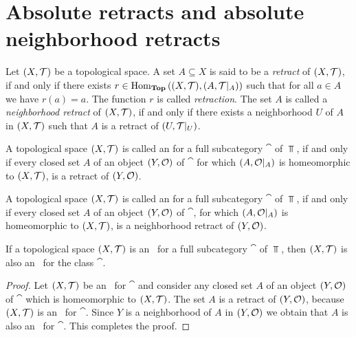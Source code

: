 \chapter{Absolute retracts and absolute neighborhood retracts}

\begin{definition}
	Let $\tspace$ be a topological space. A set $A \subseteq X$ is said to be a \textit{retract} of $\tspace$, if and only if there exists $r \in \Hom_\Top\pbraces{\tspace, \reltspace}$ such that for all $a \in A$ we have $r(a) = a$. The function $r$ is called \textit{retraction}. The set $A$ is called a \textit{neighborhood retract} of $\tspace$, if and only if there exists a neighborhood $U$ of $A$ in $\tspace$ such that $A$ is a retract of $\reltspace[U][T]$. 
\end{definition}

\begin{definition}
	A topological space $\tspace$ is called an \textit{\ar} for a full subcategory $\cat$ of $\Top$, if and only if every closed set $A$ of an object $\tspace[Y][O]$ of $\cat$ for which ${\left ( A, \mathcal{O}\vert_A \right )}$ is homeomorphic to $\tspace$, is a retract of $\tspace[Y][O]$.    
\end{definition}

\begin{definition}
	A topological space $\tspace$ is called an \textit{\anr} for a full subcategory $\cat$ of $\Top$, if and only if every closed set $A$ of an object $\tspace[Y][O]$ of $\cat$, for which ${\left ( A, \mathcal{O}\vert_A \right )}$ is homeomorphic to $\tspace$, is a neighborhood retract of $\tspace[Y][O]$.    
\end{definition}

\begin{proposition}
	If a topological space $\tspace$ is an \ar\ for a full subcategory $\cat$ of $\Top$, then $\tspace$ is also an \anr\ for the class $\cat$. 
\end{proposition}
\begin{proof}
	Let $\tspace$ be an \ar\ for $\cat$ and consider any closed set $A$ of an object $\tspace[Y][O]$ of $\cat$ which is homeomorphic to $\tspace$. The set $A$ is a retract of $\tspace[Y][O]$, because $\tspace$ is an \ar\ for $\cat$. Since $Y$ is a neighborhood of $A$ in $\tspace[Y][O]$ we obtain that $A$ is also an \anr\ for $\cat$. This completes the proof. 
\end{proof}

